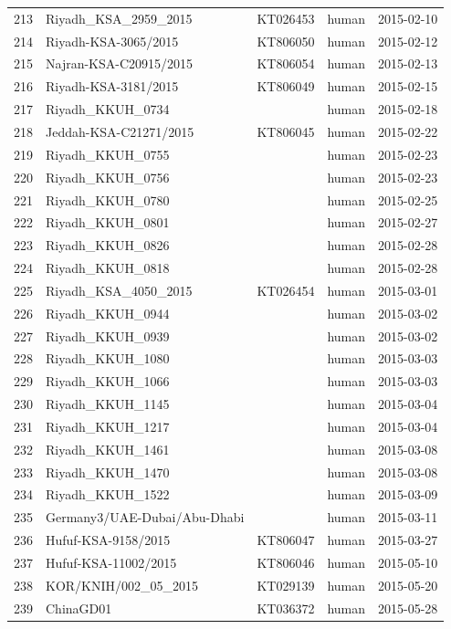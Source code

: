 \documentclass[11pt,oneside,letterpaper]{article}
\begin{document}
\begin{longtable}{ | r | l | p{2cm} | l | l | }
  213 & Riyadh\_KSA\_2959\_2015 & KT026453 & human & 2015-02-10 \\
  214 & Riyadh-KSA-3065/2015 & KT806050 & human & 2015-02-12 \\
  215 & Najran-KSA-C20915/2015 & KT806054 & human & 2015-02-13 \\
  216 & Riyadh-KSA-3181/2015 & KT806049 & human & 2015-02-15 \\
  217 & Riyadh\_KKUH\_0734 &  & human & 2015-02-18 \\
  218 & Jeddah-KSA-C21271/2015 & KT806045 & human & 2015-02-22 \\
  219 & Riyadh\_KKUH\_0755 &  & human & 2015-02-23 \\
  220 & Riyadh\_KKUH\_0756 &  & human & 2015-02-23 \\
  221 & Riyadh\_KKUH\_0780 &  & human & 2015-02-25 \\
  222 & Riyadh\_KKUH\_0801 &  & human & 2015-02-27 \\
  223 & Riyadh\_KKUH\_0826 &  & human & 2015-02-28 \\
  224 & Riyadh\_KKUH\_0818 &  & human & 2015-02-28 \\
  225 & Riyadh\_KSA\_4050\_2015 & KT026454 & human & 2015-03-01 \\
  226 & Riyadh\_KKUH\_0944 &  & human & 2015-03-02 \\
  227 & Riyadh\_KKUH\_0939 &  & human & 2015-03-02 \\
  228 & Riyadh\_KKUH\_1080 &  & human & 2015-03-03 \\
  229 & Riyadh\_KKUH\_1066 &  & human & 2015-03-03 \\
  230 & Riyadh\_KKUH\_1145 &  & human & 2015-03-04 \\
  231 & Riyadh\_KKUH\_1217 &  & human & 2015-03-04 \\
  232 & Riyadh\_KKUH\_1461 &  & human & 2015-03-08 \\
  233 & Riyadh\_KKUH\_1470 &  & human & 2015-03-08 \\
  234 & Riyadh\_KKUH\_1522 &  & human & 2015-03-09 \\
  235 & Germany3/UAE-Dubai/Abu-Dhabi &  & human & 2015-03-11 \\
  236 & Hufuf-KSA-9158/2015 & KT806047 & human & 2015-03-27 \\
  237 & Hufuf-KSA-11002/2015 & KT806046 & human & 2015-05-10 \\
  238 & KOR/KNIH/002\_05\_2015 & KT029139 & human & 2015-05-20 \\
  239 & ChinaGD01 & KT036372 & human & 2015-05-28 \\

\end{longtable}
\end{document}
